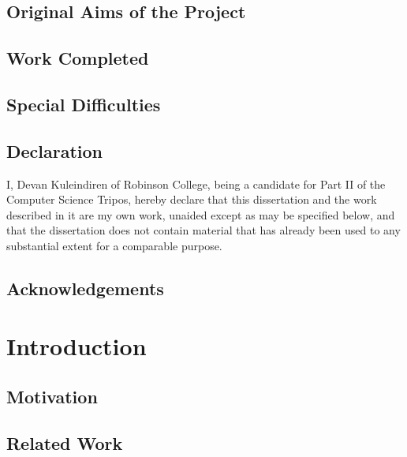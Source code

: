 \documentclass[a4paper, 12pt]{report}
\begin{document}
\section*{Original Aims of the Project}

\section*{Work Completed}

\section*{Special Difficulties}

 
\newpage
\section*{Declaration}

I, Devan Kuleindiren of Robinson College, being a candidate for Part II of the Computer Science Tripos, hereby declare that this dissertation and the work described in it are my own work, unaided except as may be specified below, and that the dissertation does not contain material that has already been used to any substantial extent for a comparable purpose.

\bigskip
{}

\medskip
{}

\tableofcontents

\listoffigures

\newpage
\section*{Acknowledgements}



\pagestyle{headings}

\chapter{Introduction}
\section{Motivation}
\section{Related Work}
\end{document}
